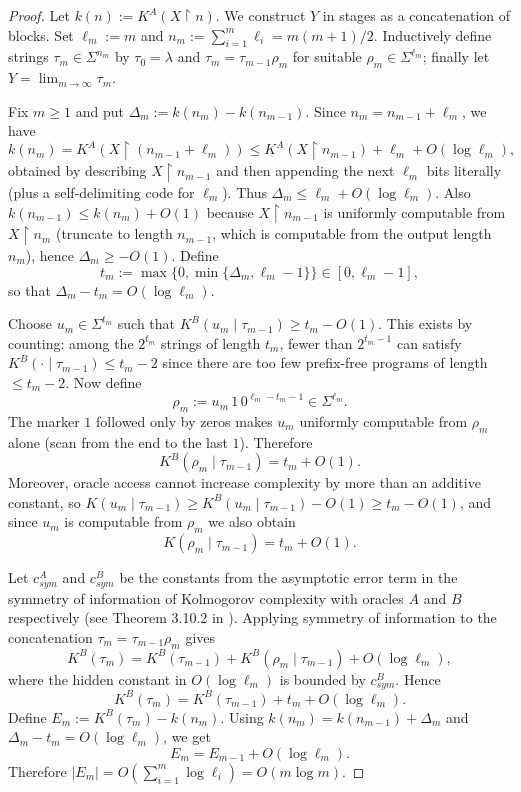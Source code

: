 \documentclass[11pt]{article}
\newcommand{\restr}{\upharpoonright}
\begin{document}
\begin{proof}
	Let $k(n):=K^{A}(X\restr n)$. We construct $Y$ in stages as a concatenation of blocks.
	Set $\ell_m:=m$ and $n_m:=\sum_{i=1}^m \ell_i=m(m+1)/2$.
	Inductively define strings $\tau_m\in\Sigma^{n_m}$ by $\tau_0=\lambda$ and $\tau_m=\tau_{m-1}\rho_m$ for suitable $\rho_m\in\Sigma^{\ell_m}$; finally let $Y=\lim_{m\to\infty}\tau_m$.
	
	Fix $m\ge 1$ and put $\Delta_m:=k(n_m)-k(n_{m-1})$. Since $n_m=n_{m-1}+\ell_m$, we have
	\[
	k(n_m)=K^{A}(X\restr(n_{m-1}+\ell_m))\le K^{A}(X\restr n_{m-1})+\ell_m+O(\log \ell_m),
	\]
	obtained by describing $X\restr n_{m-1}$ and then appending the next $\ell_m$ bits literally (plus a self-delimiting code for $\ell_m$). Thus $\Delta_m\le \ell_m+O(\log \ell_m)$.
	Also $k(n_{m-1})\le k(n_m)+O(1)$ because $X\restr n_{m-1}$ is uniformly computable from $X\restr n_m$ (truncate to length $n_{m-1}$, which is computable from the output length $n_m$), hence $\Delta_m\ge -O(1)$.
	Define
	\[
	t_m:=\max\{0,\min\{\Delta_m,\ell_m-1\}\}\in[0,\ell_m-1],
	\]
	so that $\Delta_m-t_m=O(\log\ell_m)$.
	
	Choose $u_m\in\Sigma^{t_m}$ such that $K^{B}(u_m\mid\tau_{m-1})\ge t_m-O(1)$.
	This exists by counting: among the $2^{t_m}$ strings of length $t_m$, fewer than $2^{t_m-1}$ can satisfy
	$K^{B}(\cdot\mid\tau_{m-1})\le t_m-2$ since there are too few prefix-free programs of length $\le t_m-2$.
	Now define
	\[
	\rho_m:=u_m\,1\,0^{\ell_m-t_m-1}\in\Sigma^{\ell_m}.
	\]
	The marker $1$ followed only by zeros makes $u_m$ uniformly computable from $\rho_m$ alone (scan from the end to the last $1$). Therefore
	\[
	K^{B}(\rho_m\mid\tau_{m-1}) = t_m+O(1).
	\]
	Moreover, oracle access cannot increase complexity by more than an additive constant, so
	$K(u_m\mid\tau_{m-1})\ge K^{B}(u_m\mid\tau_{m-1})-O(1)\ge t_m-O(1)$,
	and since $u_m$ is computable from $\rho_m$ we also obtain
	\[
	K(\rho_m\mid\tau_{m-1}) = t_m+O(1).
	\]
	
	Let $c_{sym}^A$ and $c_{sym}^B$ be the constants from the asymptotic error term in the symmetry of information of Kolmogorov complexity with oracles $A$ and $B$ respectively (see Theorem 3.10.2 in \cite{Downey10}).
	Applying symmetry of information to the concatenation $\tau_m=\tau_{m-1}\rho_m$ gives
	\[
	K^{B}(\tau_m)=K^{B}(\tau_{m-1})+K^{B}(\rho_m\mid\tau_{m-1})+O(\log \ell_m),
	\]
	where the hidden constant in $O(\log\ell_m)$ is bounded by $c_{sym}^B$. Hence
	\[
	K^{B}(\tau_m)=K^{B}(\tau_{m-1})+t_m+O(\log \ell_m).
	\]
	Define $E_m:=K^{B}(\tau_m)-k(n_m)$. Using $k(n_m)=k(n_{m-1})+\Delta_m$ and $\Delta_m-t_m=O(\log\ell_m)$, we get
	\[
	E_m = E_{m-1}+O(\log\ell_m).
	\]
	Therefore $|E_m|=O\!\left(\sum_{i=1}^m \log \ell_i\right)=O(m\log m)$.
	

\end{proof}
\end{document}
